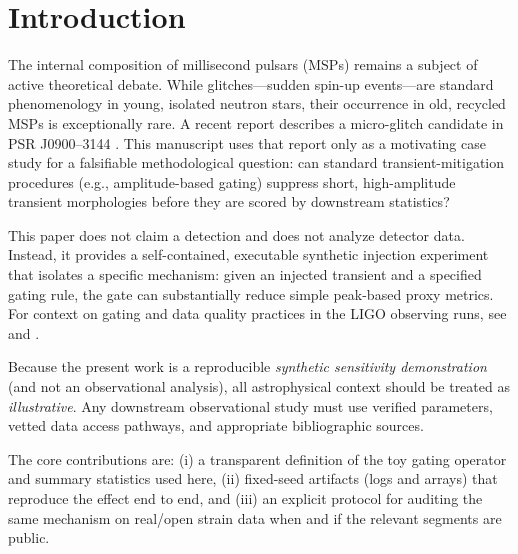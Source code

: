 \section{Introduction}
\label{sec:introduction}
The internal composition of millisecond pulsars (MSPs) remains a subject of active theoretical debate. While glitches---sudden spin-up events---are standard phenomenology in young, isolated neutron stars, their occurrence in old, recycled MSPs is exceptionally rare. A recent report describes a micro-glitch candidate in PSR J0900--3144 \cite{bhat2025}. This manuscript uses that report only as a motivating case study for a falsifiable methodological question: can standard transient-mitigation procedures (e.g., amplitude-based gating) suppress short, high-amplitude transient morphologies before they are scored by downstream statistics?

This paper does not claim a detection and does not analyze detector data. Instead, it provides a self-contained, executable synthetic injection experiment that isolates a specific mechanism: given an injected transient and a specified gating rule, the gate can substantially reduce simple peak-based proxy metrics. For context on gating and data quality practices in the LIGO observing runs, see \cite{davis2021} and \cite{abbott2020guide}.

Because the present work is a reproducible \emph{synthetic sensitivity demonstration} (and not an observational analysis), all astrophysical context should be treated as \emph{illustrative}. Any downstream observational study must use verified parameters, vetted data access pathways, and appropriate bibliographic sources.

The core contributions are: (i) a transparent definition of the toy gating operator and summary statistics used here, (ii) fixed-seed artifacts (logs and arrays) that reproduce the effect end to end, and (iii) an explicit protocol for auditing the same mechanism on real/open strain data when and if the relevant segments are public.

